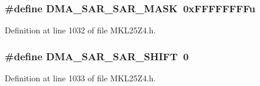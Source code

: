 \subsubsection[{\texorpdfstring{D\+M\+A\+\_\+\+S\+A\+R\+\_\+\+S\+A\+R\+\_\+\+M\+A\+SK}{DMA_SAR_SAR_MASK}}]{\setlength{\rightskip}{0pt plus 5cm}\#define D\+M\+A\+\_\+\+S\+A\+R\+\_\+\+S\+A\+R\+\_\+\+M\+A\+SK~0x\+F\+F\+F\+F\+F\+F\+F\+Fu}\hypertarget{group___d_m_a___register___masks_ga990e3ca99cc1d75f5942432959953048}{}\label{group___d_m_a___register___masks_ga990e3ca99cc1d75f5942432959953048}


Definition at line 1032 of file M\+K\+L25\+Z4.\+h.

\subsubsection[{\texorpdfstring{D\+M\+A\+\_\+\+S\+A\+R\+\_\+\+S\+A\+R\+\_\+\+S\+H\+I\+FT}{DMA_SAR_SAR_SHIFT}}]{\setlength{\rightskip}{0pt plus 5cm}\#define D\+M\+A\+\_\+\+S\+A\+R\+\_\+\+S\+A\+R\+\_\+\+S\+H\+I\+FT~0}\hypertarget{group___d_m_a___register___masks_ga869308e6de564860ede4d607b19bce31}{}\label{group___d_m_a___register___masks_ga869308e6de564860ede4d607b19bce31}


Definition at line 1033 of file M\+K\+L25\+Z4.\+h.

